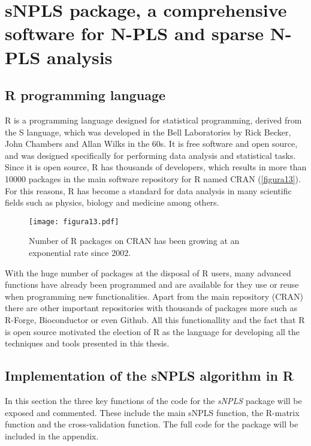 
\chapter[sNPLS package, a comprehensive software for N-PLS and sparse N-PLS analysis]{sNPLS package, a comprehensive software for N-PLS and sparse N-PLS analysis}
\label{chapter:package}


\section{R programming language}
R is a programming language designed for statistical programming, derived from the S language, which was developed in the Bell Laboratories by Rick Becker, John Chambers and Allan Wilks in the 60s. It is free software and open source, and was designed specifically for performing data analysis and statistical tasks. Since it is open source, R has thousands of developers, which results in more than 10000 packages in the main software repository for R named CRAN (\autoref{figura13}). For this reasons, R has become a standard for data analysis in many scientific fields such as physics, biology and medicine among others. 

\begin{figure}[hbtp]
	\centering
\texttt{[image: figura13.pdf]}
\caption{Number of R packages on CRAN has been growing at an exponential rate since 2002.}
\label{figura13}
\end{figure}

With the huge number of packages at the disposal of R users, many advanced functions have already been programmed and are available for they use or reuse when programming new functionalities. Apart from the main repository (CRAN) there are other important repositories with thousands of packages more such as R-Forge, Bioconductor or even Github. All this functionallity and the fact that R is open source motivated the election of R as the language for developing all the techniques and tools presented in this thesis.


\section{Implementation of the sNPLS algorithm in R}
In this section the three key functions of the code for the \textit{sNPLS} package will be exposed and commented. These include the main sNPLS function, the R-matrix function and the cross-validation function. The full code for the package will be included in the appendix.

